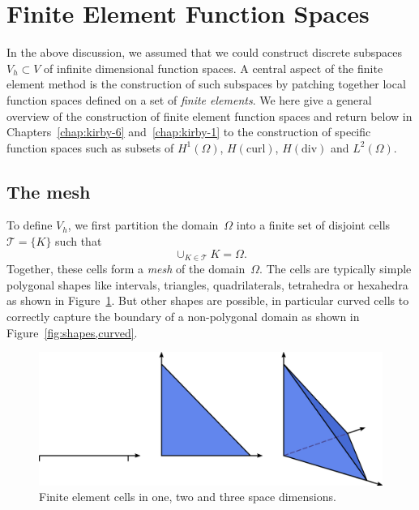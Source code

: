 \section{Finite Element Function Spaces}

In the above discussion, we assumed that we could construct discrete
subspaces $V_h \subset V$ of infinite dimensional function spaces.  A
central aspect of the finite element method is the construction of
such subspaces by patching together local function spaces defined on a
set of \emph{finite elements}. We here give a general overview of the
construction of finite element function spaces and return below in
Chapters~\ref{chap:kirby-6} and~\ref{chap:kirby-1} to the construction of
specific function spaces such as subsets of $H^1(\Omega)$,
$H(\mathrm{curl})$, $H(\mathrm{div})$ and $L^2(\Omega)$.

\subsection{The mesh}

To define $V_h$, we first partition the domain~$\Omega$ into a finite
set of disjoint cells $\mathcal{T} = \{K\}$ such that
\begin{displaymath}
  \cup_{K\in\mathcal{T}} K = \Omega.
\end{displaymath}
Together, these cells form a \emph{mesh} of the domain~$\Omega$. The
cells are typically simple polygonal shapes like intervals, triangles,
quadrilaterals, tetrahedra or hexahedra as shown in
Figure~\ref{fig:shapes}. But other shapes are possible, in particular
curved cells to correctly capture the boundary of a non-polygonal
domain as shown in Figure~\ref{fig:shapes,curved}.

\begin{figure}
  \begin{center}
      \includegraphics[width=\largewidth]{chapters/kirby-7/eps/cells.eps}
      \caption{Finite element cells in one, two and three space dimensions.}
    \label{fig:shapes}
  \end{center}
\end{figure}

